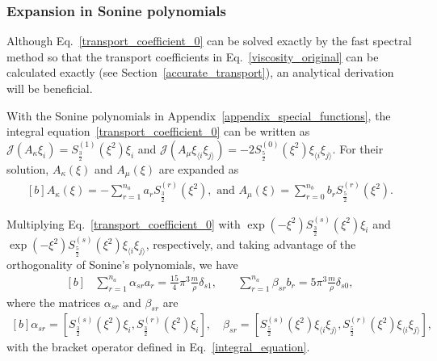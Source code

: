 \subsubsection{Expansion in Sonine polynomials}

Although Eq.~\eqref{transport_coefficient_0} can be solved exactly by the fast spectral method so that the transport coefficients in Eq.~\eqref{viscosity_original} can be calculated exactly (see Section~\ref{accurate_transport}), an analytical derivation will be beneficial. 

With the Sonine polynomials in Appendix~\ref{appendix_special_functions}, the integral equation~\eqref{transport_coefficient_0} can be written as $\mathcal{J}(A_\kappa\xi_i)=S^{(1)}_{\frac{3}{2}}(\xi^2)\xi_i$ and $\mathcal{J}(A_\mu\xi_{\langle{i}}\xi_{j\rangle})=-2S^{(0)}_{\frac{5}{2}}(\xi^2) \xi_{\langle{i}}\xi_{j\rangle}$. For their solution, $A_\kappa(\xi)$ and $A_\mu(\xi)$ are expanded as
\begin{equation}\label{sonine_expansion}
\begin{aligned}[b]
A_\kappa(\xi)=-\sum_{r=1}^{n_a}a_rS^{(r)}_{\frac{3}{2}}(\xi^2), 
\text{~and~}
A_\mu(\xi)=\sum_{r=0}^{n_b}b_rS^{(r)}_{\frac{5}{2}}(\xi^2).
\end{aligned}
\end{equation}





Multiplying Eq.~\eqref{transport_coefficient_0} with $\exp(-\xi^2)S^{(s)}_{\frac{3}{2}}(\xi^2)\xi_i$ and $\exp(-\xi^2)S^{(s)}_{\frac{5}{2}}(\xi^2)\xi_{\langle{i}}\xi_{j\rangle}$, respectively, and  taking advantage of the orthogonality of Sonine's polynomials, we have
\begin{equation}
\begin{aligned}[b]
&\sum_{r=1}^{n_a}\alpha_{sr}a_r=\frac{15}{4}\pi^3\frac{m}{\rho}\delta_{s1}, \quad
&\sum_{r=1}^{n_a}\beta_{sr}b_r=5\pi^3\frac{m}{\rho}\delta_{s0},
\end{aligned}
\end{equation} 
where the matrices $\alpha_{sr}$ and $\beta_{sr}$ are
\begin{equation}
\begin{aligned}[b]
\alpha_{sr}=\left[S^{(s)}_{\frac{3}{2}}(\xi^2)\xi_i,S^{(r)}_{\frac{3}{2}}(\xi^2)\xi_i\right],\quad
\beta_{sr}=\left[S^{(s)}_{\frac{5}{2}}(\xi^2)\xi_{\langle{i}}\xi_{j\rangle},S^{(r)}_{\frac{5}{2}}(\xi^2)\xi_{\langle{i}}\xi_{j\rangle}\right],
\end{aligned}
\end{equation}
with the bracket operator defined in Eq.~\eqref{integral_equation}.

